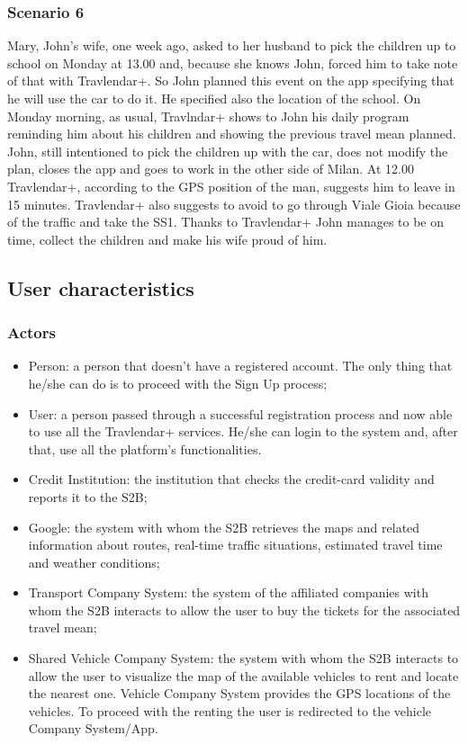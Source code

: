 	\subsubsection{Scenario 6}
		Mary, John's wife, one week ago, asked to her husband to pick the children up to school on Monday at 13.00 and, because she knows John,  forced him to take note of that with Travlendar+.\newline
		So John planned this event on the app specifying that he will use the car to do it.
		He specified also the location of the school.\newline
		On Monday morning, as usual, Travlndar+ shows to John his daily program reminding him about his children and showing the previous  travel mean planned.\newline
		John, still intentioned to pick the children up with the car, does not modify the plan, closes the app and goes to work in the other side of Milan.\newline
		At 12.00 Travlendar+, according to the GPS position of the man, suggests him to leave in 15 minutes.
		Travlendar+ also suggests to avoid to go through  Viale Gioia because of the traffic and take the SS1.\newline
		Thanks to Travlendar+ John manages to be on time, collect the children and make his wife proud of him. 
\subsection{User characteristics}
	\subsubsection{Actors}
			\begin{itemize}
			\item Person: a person that doesn't have a registered account. The only thing that he/she can do is to proceed with the Sign Up process;
			\item User: a person passed through a successful registration process and now
			able to use all the Travlendar+ services. He/she can login to the system and, after that, use all
			the platform's functionalities.
			\item Credit Institution: the institution that checks the credit-card validity and reports it to the S2B;
			\item Google: the system with whom the S2B retrieves the maps and related information about routes, real-time traffic situations, estimated travel time and weather conditions;
			\item Transport Company System: the system of the affiliated companies with whom the S2B interacts to allow the user to buy the tickets for the associated travel mean;
			\item Shared Vehicle Company System: the system with whom the S2B interacts to allow the user to visualize the map of the available vehicles to rent and locate the nearest one. Vehicle Company System provides the GPS locations of the vehicles. To proceed with the renting the user is redirected to the vehicle Company System/App.
	
		\end{itemize}
